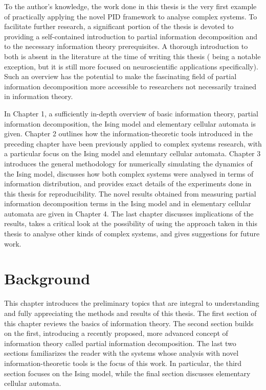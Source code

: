 \documentclass[12pt]{article}
\begin{document}
To the author's knowledge, the work done in this thesis is the very first example of practically applying the novel PID framework to analyse complex systems. To facilitate further research, a significant portion of the thesis is devoted to providing a self-contained introduction to partial information decomposition and to the necessary information theory prerequisites. A thorough introduction to both is absent in the literature at the time of writing this thesis (\cite{bits-from-brains} being a notable exception, but it is still more focused on neuroscientific applications specifically). Such an overview has the potential to make the fascinating field of partial information decomposition more accessible to researchers not necessarily trained in information theory.  

In Chapter 1, a sufficiently in-depth overview of basic information theory, partial information decomposition, the Ising model and elementary cellular automata is given. Chapter 2 outlines how the information-theoretic tools introduced in the preceding chapter have been previously applied to complex systems research, with a particular focus on the Ising model and elemntary cellular automata. Chapter 3 introduces the general methodology for numerically simulating the dynamics of the Ising model, discusses how both complex systems were analysed in terms of information distribution, and provides exact details of the experiments done in this thesis for reproducibility. The novel results obtained from measuring partial information decomposition terms in the Ising model and in elementary cellular automata are given in Chapter 4. The last chapter discusses implications of the results, takes a critical look at the possibility of using the approach taken in this thesis to analyse other kinds of complex systems, and gives suggestions for future work.  

\newpage

\section{Background}

This chapter introduces the preliminary topics that are integral to understanding and fully appreciating the methods and results of this thesis. The first section of this chapter reviews the basics of information theory. The second section builds on the first, introducing a recently proposed, more advanced concept of information theory called partial information decomposition. The last two sections familiarizes the reader with the systems whose analysis with novel information-theoretic tools is the focus of this work. In particular, the third section focuses on the Ising model, while the final section discusses elementary cellular automata.
\end{document}
